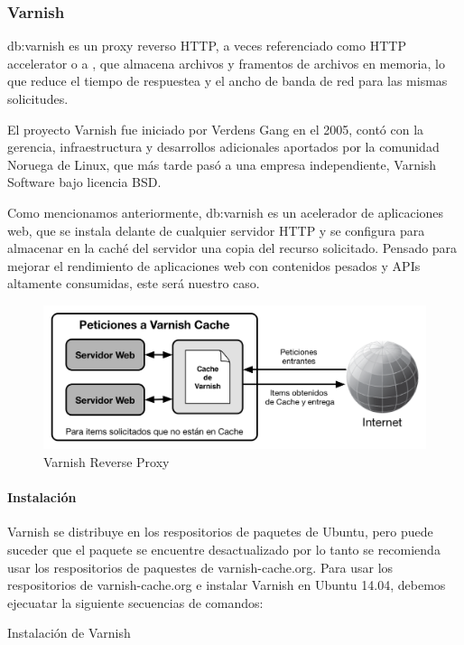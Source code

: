 \subsubsection{Varnish}
\label{soa:tecnologias:varnish}

\gls{db:varnish} es un proxy reverso HTTP, a veces referenciado como HTTP accelerator o a , que almacena archivos y framentos de archivos en memoria, lo que reduce el tiempo de respuestea y el ancho de banda de red para las mismas solicitudes.\cite[p.~20]{varnish2016}

El proyecto Varnish fue iniciado por Verdens Gang en el 2005, contó con la gerencia, infraestructura y desarrollos adicionales aportados por la comunidad Noruega de Linux, que más tarde pasó a una empresa independiente, Varnish Software bajo licencia BSD.

Como mencionamos anteriormente, \gls{db:varnish} es un acelerador de aplicaciones web, que se instala delante de cualquier servidor HTTP y se configura para almacenar en la caché del servidor una copia del recurso solicitado. Pensado para mejorar el rendimiento de aplicaciones web con contenidos pesados y APIs altamente consumidas, este será nuestro caso.

\begin{figure}[H]
  \includegraphics[width=\linewidth]{src/images/03-capitulo-3/tecnologias/varnish/varnish-reverse-proxy.png}
  \caption{Varnish Reverse Proxy}
  \label{fig:varnish}
\end{figure}

\paragraph{Instalación}

Varnish se distribuye en los respositorios de paquetes de Ubuntu, pero puede suceder que el paquete se encuentre desactualizado por lo tanto se recomienda usar los respositorios de paquestes de varnish-cache.org.
Para usar los respositorios de varnish-cache.org e instalar Varnish en Ubuntu 14.04, debemos ejecuatar la siguiente secuencias de comandos:

\begin{listing}[H]
  \caption{Instalación de Varnish}
  \label{soa:tecnologias:varnish-cache:bash-preparacion}
\end{listing}
